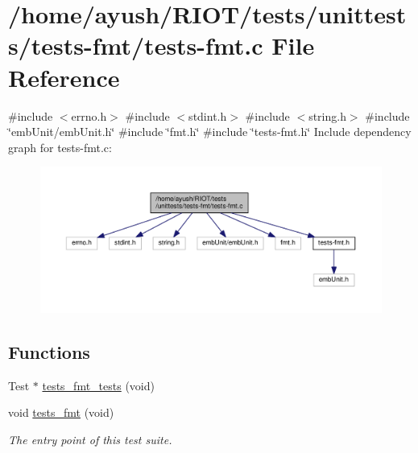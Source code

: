 \hypertarget{tests-fmt_8c}{}\section{/home/ayush/\+R\+I\+O\+T/tests/unittests/tests-\/fmt/tests-\/fmt.c File Reference}
\label{tests-fmt_8c}
{\ttfamily \#include $<$errno.\+h$>$}\newline
{\ttfamily \#include $<$stdint.\+h$>$}\newline
{\ttfamily \#include $<$string.\+h$>$}\newline
{\ttfamily \#include \char`\"{}emb\+Unit/emb\+Unit.\+h\char`\"{}}\newline
{\ttfamily \#include \char`\"{}fmt.\+h\char`\"{}}\newline
{\ttfamily \#include \char`\"{}tests-\/fmt.\+h\char`\"{}}\newline
Include dependency graph for tests-\/fmt.c\+:
\nopagebreak
\begin{figure}[H]
\begin{center}
\leavevmode
\includegraphics[width=350pt]{tests-fmt_8c__incl}
\end{center}
\end{figure}
\subsection*{Functions}
\textbf{ }\par
\begin{DoxyCompactItemize}
\item 
Test $\ast$ \hyperlink{tests-fmt_8c_a1d630c6f7fbcf08065b19047d93f77fd}{tests\+\_\+fmt\+\_\+tests} (void)
\item 
void \hyperlink{group__unittests_ga548762e77adf86c79fe9360cee603bbd}{tests\+\_\+fmt} (void)
\begin{DoxyCompactList}\small\item\em The entry point of this test suite. \end{DoxyCompactList}\end{DoxyCompactItemize}



